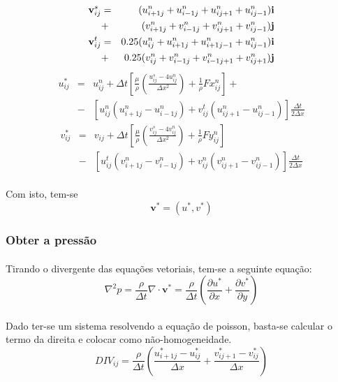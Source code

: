 \documentclass[poisson.tex]{subfiles}
\begin{document}
\begin{eqnarray}
\textbf{v}_{ij}^s&=&({u}_{i+1j}^n+{u}_{i-1j}^n+{u}_{ij+1}^n+{u}_{ij-1}^n)\textbf{i} \nonumber \\&+& ({v}_{i+1j}^n+{v}_{i-1j}^n+{v}_{ij+1}^n+{v}_{ij-1}^n)\textbf{j}\\
\textbf{v}_{ij}^t&=&0.25(u_{ij}^n+u_{i+1j}^n+u_{i+1j-1}^n+u_{ij-1}^n)\textbf{i} \nonumber \\ &+& 0.25(v_{ij}^n+v_{i-1j}^n+v_{i-1j+1}^n+v_{ij+1}^n)\textbf{j}
\end{eqnarray}
\begin{eqnarray}
u_{ij}^{*}&=&u_{ij}^n+\Delta t\left[\frac{\mu}{\rho}\left(\frac{u_{ij}^s-4u_{ij}^n}{\Delta
x^2}\right)+\frac{1}{\rho}Fx_{ij}^n\right] + \nonumber \\
&-&\left[u_{ij}^n(u_{i+1j}^n-u_{i-1j}^n)+v_{ij}^t(u_{ij+1}^n-u_{ij-1}^n)\right]\frac{\Delta t}{2\Delta x}
\end{eqnarray}
\begin{eqnarray}
v_{ij}^{*}&=&v_{ij}+\Delta t\left[\frac{\mu}{\rho}\left(\frac{v_{ij}^s-4v_{ij}^n}{\Delta
x^2}\right)+\frac{1}{\rho}Fy_{ij}^n\right] \nonumber \\
&-&\left[u_{ij}^t (v_{i+1j}^n-v_{i-1j}^n)+v_{ij}^n(v_{ij+1}^n-v_{ij-1}^n)\right]\frac{\Delta t}{2\Delta x}
\end{eqnarray}

\paragraph{} Com isto, tem-se \[\textbf{v}^{*}=(u^*,v^*)\]
\subsubsection{Obter a pressão}
\paragraph{} Tirando o divergente das equações vetoriais, tem-se a seguinte equação:
\begin{equation}
\nabla^2 p = \frac{\rho}{\Delta t} \nabla\cdot \textbf{v}^*=\frac{\rho}{\Delta t} 
\left( \frac{\partial u^*}{\partial x}+\frac{\partial v^*}{\partial y} \right)
\end{equation}
\paragraph{} Dado ter-se um sistema resolvendo a equação de poisson, basta-se calcular o termo da direita e colocar como não-homogeneidade.
\begin{equation}
DIV_{ij}=\frac{\rho}{\Delta t}\left( \frac{u_{i+1j}^*-u_{ij}^*}{\Delta x}+\frac{v_{ij+1}^*-v_{ij}^*}{\Delta x}\right)
\end{equation}
\end{document}
